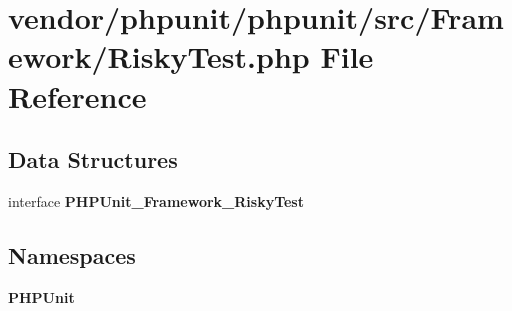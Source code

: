 \section{vendor/phpunit/phpunit/src/\+Framework/\+Risky\+Test.php File Reference}
\label{_risky_test_8php}
\subsection*{Data Structures}
\begin{DoxyCompactItemize}
\item 
interface {\bf P\+H\+P\+Unit\+\_\+\+Framework\+\_\+\+Risky\+Test}
\end{DoxyCompactItemize}
\subsection*{Namespaces}
\begin{DoxyCompactItemize}
\item 
 {\bf P\+H\+P\+Unit}
\end{DoxyCompactItemize}
